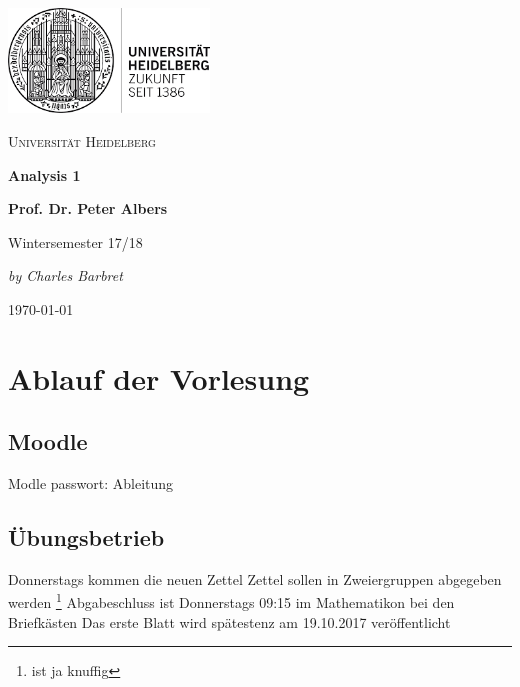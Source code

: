 \documentclass[12pt,a4paper]{article} %
\begin{document}
	\begin{titlepage} %
	\centering
	\includegraphics[width=0.40\textwidth]{UniLogo}\par\vspace{1cm}
		{\scshape\LARGE Universität Heidelberg \par}
		\vspace{1cm}
		{\Huge\bfseries Analysis 1 \par}
		\vspace{1cm}
		{\LARGE\bfseries Prof. Dr. Peter Albers \par}
		\vspace{1cm}
		{\huge Wintersemester 17/18 \par}
		\vspace{2cm}
		{\Large\itshape by Charles Barbret \par}
		
		\vfill

		{\large \gerDate\today\par}
	\end{titlepage}

\tableofcontents %
\newpage %


\section{Ablauf der Vorlesung}
\subsection{Moodle}
Modle passwort: Ableitung
\subsection{Übungsbetrieb}
Donnerstags kommen die neuen Zettel \newline
Zettel sollen in Zweiergruppen abgegeben werden \footnote{ist ja knuffig} \newline
Abgabeschluss ist Donnerstags 09:15 im Mathematikon bei den Briefkästen \newline
Das erste Blatt wird spätestenz am 19.10.2017 veröffentlicht 
\end{document}

